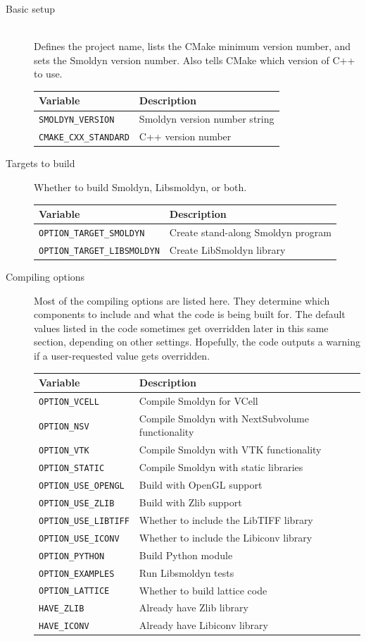 \documentclass {scrbook}
\newcommand {\ttt} {\texttt}
\begin{document}
\begin{description}

\item[Basic setup]
\hfill \\
Defines the project name, lists the CMake minimum version number, and sets the Smoldyn version number. Also tells CMake which version of C++ to use.\\
\begin{longtable}[c]{ll}
Variable & Description\\
\hline
\ttt{SMOLDYN\_VERSION} & Smoldyn version number string\\
\ttt{CMAKE\_CXX\_STANDARD} & C++ version number\\
\end{longtable}

\item[Targets to build]
Whether to build Smoldyn, Libsmoldyn, or both.
\begin{longtable}[c]{ll}
Variable & Description\\
\hline
\ttt{OPTION\_TARGET\_SMOLDYN} & Create stand-along Smoldyn program\\
\ttt{OPTION\_TARGET\_LIBSMOLDYN} & Create LibSmoldyn library\\
\end{longtable}

\item[Compiling options]
Most of the compiling options are listed here. They determine which components to include and what the code is being built for. The default values listed in the code sometimes get overridden later in this same section, depending on other settings. Hopefully, the code outputs a warning if a user-requested value gets overridden.
\begin{longtable}[c]{ll}
Variable & Description\\
\hline
\ttt{OPTION\_VCELL} & Compile Smoldyn for VCell\\
\ttt{OPTION\_NSV} & Compile Smoldyn with NextSubvolume functionality\\
\ttt{OPTION\_VTK} & Compile Smoldyn with VTK functionality\\
\ttt{OPTION\_STATIC} & Compile Smoldyn with static libraries\\
\ttt{OPTION\_USE\_OPENGL} & Build with OpenGL support\\
\ttt{OPTION\_USE\_ZLIB} & Build with Zlib support\\
\ttt{OPTION\_USE\_LIBTIFF} & Whether to include the LibTIFF library\\
\ttt{OPTION\_USE\_ICONV} & Whether to include the Libiconv library\\
\ttt{OPTION\_PYTHON}  & Build Python module\\
\ttt{OPTION\_EXAMPLES} & Run Libsmoldyn tests\\
\ttt{OPTION\_LATTICE} & Whether to build lattice code\\
\ttt{HAVE\_ZLIB} & Already have Zlib library\\
\ttt{HAVE\_ICONV} & Already have Libiconv library\\
\end{longtable}


\end{description}
\end{document}
